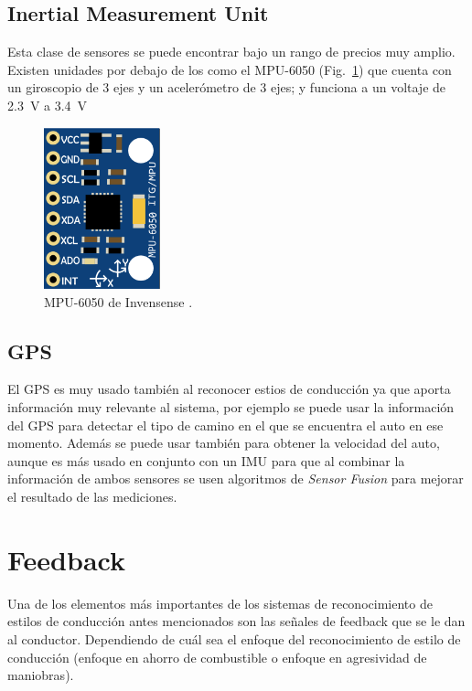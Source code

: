 \subsection{Inertial Measurement Unit}
Esta clase de sensores se puede encontrar bajo un rango de precios muy amplio. Existen unidades por debajo de los  como el MPU-6050 (Fig.~\ref{fig:2.7}) que cuenta con un giroscopio de 3 ejes y un acelerómetro de 3 ejes; y funciona a un voltaje de \SI[mode=text]{2.3}{V} a \SI[mode=text]{3.4}{V} \cite{invensense}

\begin{figure}[htpb!]
\centering
\includegraphics[width=0.3\textwidth]{Fig7}
\caption[MPU-5050 de Invensense]{MPU-6050 de Invensense \cite{invensense}.}
\label{fig:2.7}
\end{figure}

\subsection{GPS}
El GPS es muy usado también al reconocer estios de conducción ya que aporta información muy relevante al sistema, por ejemplo se puede usar la información del GPS para detectar el tipo de camino en el que se encuentra el auto en ese momento. Además se puede usar también para obtener la velocidad del auto, aunque es más usado en conjunto con un IMU para que al combinar la información de ambos sensores se usen algoritmos de {\it Sensor Fusion} para mejorar el resultado de las mediciones.

\section{Feedback}
Una de los elementos más importantes de los sistemas de reconocimiento de estilos de conducción antes mencionados son las señales de feedback que se le dan al conductor. Dependiendo de cuál sea el enfoque del reconocimiento de estilo de conducción (enfoque en ahorro de combustible o enfoque en agresividad de maniobras).

